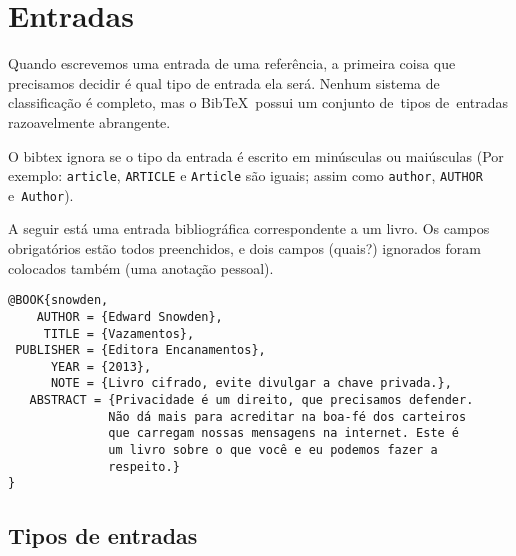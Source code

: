 \documentclass[article,openany]{memoir}
\begin{document}
\chapter{Entradas}

Quando escrevemos uma entrada de uma referência, a primeira coisa que
precisamos decidir é qual tipo de entrada ela será. Nenhum sistema de
classificação é completo, mas o Bib\TeX\ possui um conjunto de~tipos
de~entradas razoavelmente abrangente.



O bibtex ignora se o tipo da entrada é escrito em minúsculas ou
maiúsculas (Por exemplo: \verb/article/, \verb/ARTICLE/
e \verb/Article/ são iguais; assim como \verb/author/, \verb/AUTHOR/
e~\verb/Author/).

A seguir está uma entrada bibliográfica correspondente a um livro. Os
campos obrigatórios estão todos preenchidos, e dois campos (quais?)
ignorados foram colocados também (uma anotação pessoal).

\begin{verbatim}
@BOOK{snowden,
    AUTHOR = {Edward Snowden},
     TITLE = {Vazamentos},
 PUBLISHER = {Editora Encanamentos},
      YEAR = {2013},
      NOTE = {Livro cifrado, evite divulgar a chave privada.},
   ABSTRACT = {Privacidade é um direito, que precisamos defender.
              Não dá mais para acreditar na boa-fé dos carteiros
              que carregam nossas mensagens na internet. Este é
              um livro sobre o que você e eu podemos fazer a 
              respeito.}
}

\end{verbatim}

\section{Tipos de entradas}
\end{document}
